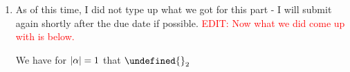 \documentclass[11pt,leqno]{article}
\theoremstyle{plain}
\theoremstyle{definition}
\numberwithin{equation}{section}
\numberwithin{lem}{section}
\let\norm\undefined %
\DeclarePairedDelimiter\norm{\lVert}{\rVert}
\begin{document}
\begin{enumerate}
\begin{enumerate}
        In the case that $p=d/s_2$ where $s_2\in (0,2+\varepsilon]$, compactly embed $H^{2+\varepsilon}$ into $W^{s,q}$ for all $q\in [1,\infty)$ where $s = 2+\varepsilon - s_2$, and deduce a similar result.

        In the case that $p>d/s_2$ for $s_2\in (0,2+\varepsilon]$, $H^{2+\varepsilon}(\Omega)$ into $C^s(\overline{\Omega})\subset W^{s,q}$ for $q\in [1,\infty]$ and $s = 2+\varepsilon - s_2$, and deduce a similar result.
        \item As of this time, I did not type up what we got for this part - I will submit again shortly after the due date if possible. \textcolor{red}{EDIT: Now what we did come up with is below.}

        We have for $\abs{\alpha} = 1$ that $\norm{}_2$
    \end{enumerate}
\end{enumerate}
\end{document}
